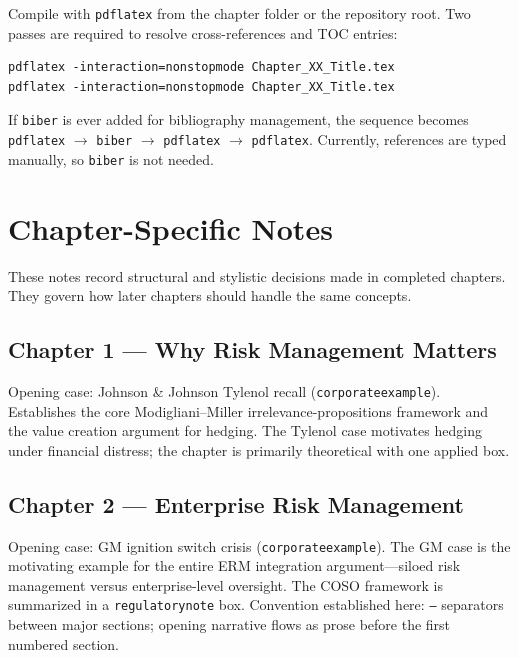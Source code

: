 \documentclass[11pt,openany]{book}
\newcommand{\code}[1]{\texttt{\small #1}}
\begin{document}
Compile with \code{pdflatex} from the chapter folder or the repository root. Two passes are required to resolve cross-references and TOC entries:

\begin{lstlisting}[language={}]
pdflatex -interaction=nonstopmode Chapter_XX_Title.tex
pdflatex -interaction=nonstopmode Chapter_XX_Title.tex
\end{lstlisting}

If \code{biber} is ever added for bibliography management, the sequence becomes \code{pdflatex} $\to$ \code{biber} $\to$ \code{pdflatex} $\to$ \code{pdflatex}. Currently, references are typed manually, so \code{biber} is not needed.

\section{Chapter-Specific Notes}
\label{sec:chapter-notes}

These notes record structural and stylistic decisions made in completed chapters. They govern how later chapters should handle the same concepts.

\subsection*{Chapter 1 --- Why Risk Management Matters}

Opening case: Johnson \& Johnson Tylenol recall (\code{corporateexample}). Establishes the core Modigliani--Miller irrelevance-propositions framework and the value creation argument for hedging. The Tylenol case motivates hedging under financial distress; the chapter is primarily theoretical with one applied box.

\subsection*{Chapter 2 --- Enterprise Risk Management}

Opening case: GM ignition switch crisis (\code{corporateexample}). The GM case is the motivating example for the entire ERM integration argument---siloed risk management versus enterprise-level oversight. The COSO framework is summarized in a \code{regulatorynote} box. Convention established here: \code{---} separators between major sections; opening narrative flows as prose before the first numbered section.
\end{document}
